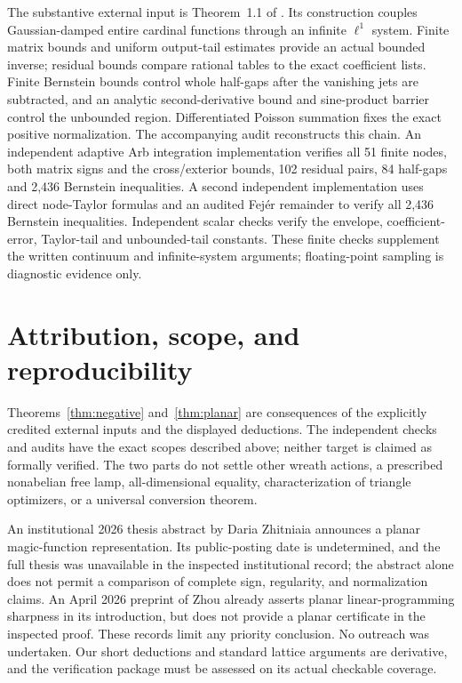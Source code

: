 \documentclass[11pt]{article}
\begin{document}
The substantive external input is Theorem~1.1 of \cite{oai090}.\allowbreak{} Its construction couples Gaussian-damped entire cardinal functions through an infinite $\ell^1$ system. Finite matrix bounds and uniform output-tail estimates provide an actual bounded inverse; residual bounds compare rational tables to the exact coefficient lists. Finite Bernstein bounds control whole half-gaps after the vanishing jets are subtracted, and an analytic second-derivative bound and sine-product barrier control the unbounded region. Differentiated Poisson summation fixes the exact positive normalization. The accompanying audit reconstructs this chain. An independent adaptive Arb integration implementation verifies all 51 finite nodes, both matrix signs and the cross/exterior bounds, 102 residual pairs, 84 half-gaps and 2,436 Bernstein inequalities. A second independent implementation uses direct node-Taylor formulas and an audited Fej\'er remainder to verify all 2,436 Bernstein inequalities. Independent scalar checks verify the envelope, coefficient-error, Taylor-tail and unbounded-tail constants. These finite checks supplement the written continuum and infinite-system arguments; floating-point sampling is diagnostic evidence only.

\section{Attribution, scope, and reproducibility}
Theorems~\ref{thm:negative} and~\ref{thm:planar} are consequences of the explicitly credited external inputs and the displayed deductions. The independent checks and audits have the exact scopes described above; neither target is claimed as formally verified. The two parts do not settle other wreath actions, a prescribed nonabelian free lamp, all-dimensional equality, characterization of triangle optimizers, or a universal conversion theorem.

An institutional 2026 thesis abstract by Daria Zhitniaia \cite{zhitniaia} announces a planar magic-function representation. Its public-posting date is undetermined, and the full thesis was unavailable in the inspected institutional record; the abstract alone does not permit a comparison of complete sign, regularity, and normalization claims. An April 2026 preprint of Zhou \cite{zhou} already asserts planar linear-programming sharpness in its introduction, but does not provide a planar certificate in the inspected proof. These records limit any priority conclusion. No outreach was undertaken. Our short deductions and standard lattice arguments are derivative, and the verification package must be assessed on its actual checkable coverage.
\end{document}
